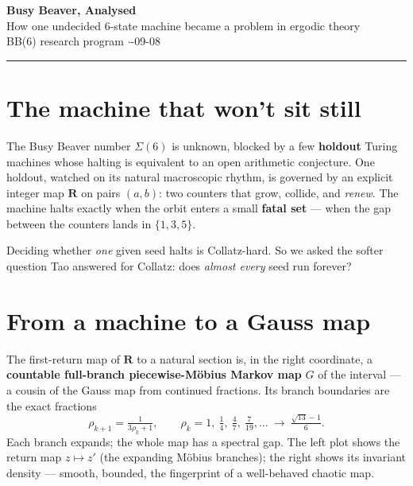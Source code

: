 \documentclass[11pt]{article}
\newcommand{\lead}[1]{{\color{acc}\textbf{#1}}}
\begin{document}
\begin{center}{\LARGE\bfseries\color{ink} Busy Beaver, Analysed}\\[3pt]
{\large\color{acc} How one undecided 6-state machine became a problem in ergodic theory}\\[2pt]
{\small BB(6) research program \quad$\cdot$-09-08}\end{center}
\vspace{4pt}\hrule\vspace{8pt}

\section{The machine that won't sit still}
The Busy Beaver number $\Sigma(6)$ is unknown, blocked by a few \lead{holdout} Turing machines whose halting is equivalent to an open arithmetic conjecture. One holdout, watched on its natural macroscopic rhythm, is governed by an explicit integer map $\mathbf R$ on pairs $(a,b)$: two counters that grow, collide, and \emph{renew}. The machine halts exactly when the orbit enters a small \lead{fatal set} --- when the gap between the counters lands in $\{1,3,5\}$.

Deciding whether \emph{one} given seed halts is Collatz-hard. So we asked the softer question Tao answered for Collatz: does \emph{almost every} seed run forever?

\section{From a machine to a Gauss map}
The first-return map of $\mathbf R$ to a natural section is, in the right coordinate, a \lead{countable full-branch piecewise-M\"obius Markov map} $G$ of the interval --- a cousin of the Gauss map from continued fractions. Its branch boundaries are the exact fractions
\[ \rho_{k+1}=\tfrac{1}{3\rho_k+1},\qquad \rho_k=1,\ \tfrac14,\ \tfrac47,\ \tfrac{7}{19},\dots\ \to\ \tfrac{\sqrt{13}-1}{6}. \]
Each branch expands; the whole map has a spectral gap. The left plot shows the return map $z\mapsto z'$ (the expanding M\"obius branches); the right shows its invariant density --- smooth, bounded, the fingerprint of a well-behaved chaotic map.
\end{document}

